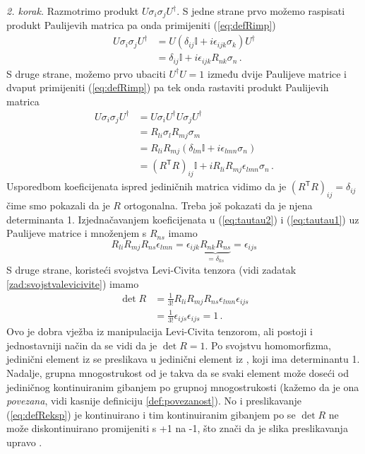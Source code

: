\emph{2. korak.} 
Razmotrimo produkt \( U \sigma_i \sigma_j U^\dagger \).  S jedne strane prvo
možemo raspisati produkt Paulijevih matrica pa onda primijeniti (\ref{eq:defRimp}) 
\begin{align}
    U \sigma_i \sigma_j U^\dagger& =  U \left(
        \delta_{ij} \mathbb{I} + i \epsilon_{ijk}\sigma_{k} \right) U^\dagger \\
                                 & = \delta_{ij} \mathbb{I} + i \epsilon_{ijk}
                                 R_{nk} \sigma_n \,.
                                 \label{eq:tautau1}
\end{align}
S druge strane, možemo prvo ubaciti $U^\dagger U = 1$ između dvije Paulijeve
matrice i dvaput primijeniti (\ref{eq:defRimp}) pa tek onda rastaviti produkt
Paulijevih matrica
\begin{align}
    U \sigma_i \sigma_j U^\dagger& =  U \sigma_i U^\dagger U \sigma_j U^\dagger \\
                                 & = R_{li} \sigma_{l} R_{mj} \sigma_{m} \\
                                 & = R_{li} R_{mj} \left(
        \delta_{lm} \mathbb{I} + i \epsilon_{lmn}\sigma_{n} \right) \\
                                 & = (R^{\mathsf{T}} R)_{ij} \mathbb{I}
                     + i R_{li} R_{mj}\epsilon_{lmn}\sigma_{n} \,.
                                 \label{eq:tautau2}
\end{align}
Usporedbom koeficijenata ispred jediničnih matrica vidimo da je
$(R^{\mathsf{T}} R)_{ij} = \delta_{ij}$ čime smo pokazali da je $R$ ortogonalna.
Treba još pokazati da je njena determinanta 1. Izjednačavanjem
koeficijenata u (\ref{eq:tautau2})  i (\ref{eq:tautau1}) uz Paulijeve matrice
i množenjem s $R_{ns}$ imamo
\begin{equation}
    R_{li} R_{mj}R_{ns}\epsilon_{lmn} = \epsilon_{ijk} \underbrace{R_{nk} R_{ns}}_{=\delta_{ks}}
    = \epsilon_{ijs}
\end{equation}
S druge strane, koristeći svojstva Levi-Civita tenzora (vidi zadatak \ref{zad:svojstvalevicivite})
imamo
\begin{align}
 \det R& = \frac{1}{3!} R_{li} R_{mj}R_{ns} \epsilon_{lmn} \epsilon_{ijs}  \\
       & = \frac{1}{3!} \epsilon_{ijs}\epsilon_{ijs} = 1\,.
\end{align}
Ovo je dobra vježba iz manipulacija Levi-Civita tenzorom, ali postoji i jednostavniji
način da se vidi da je $\det R = 1$. 
Po svojstvu homomorfizma, jedinični element iz  se preslikava u jedinični
element iz , koji ima determinantu 1.
Nadalje, grupna mnogostrukost od  je takva da se
svaki element može doseći od jediničnog kontinuiranim gibanjem po grupnoj mnogostrukosti
(kažemo da je ona \emph{povezana}, vidi kasnije definiciju \ref{def:povezanost}).
No i preslikavanje (\ref{eq:defReksp}) je kontinuirano i tim kontinuiranim gibanjem
po  se $\det R$ ne može diskontinuirano promijeniti s +1 na -1, što znači da je slika
preslikavanja upravo .

